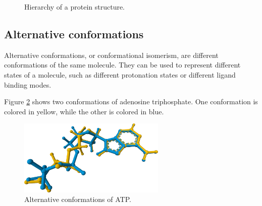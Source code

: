 \documentclass[
  digital,     %
  oneside,     %
  nosansbold,  %
  nocolorbold, %
  lof,         %
  lot,         %
]{fithesis4}
\begin{document}
\begin{figure}[htbp]
  \centering
  \caption{Hierarchy of a protein structure.}
  \label{fig:structure}
\end{figure}

\subsection{Alternative conformations}
\label{section:alternative_conformations}

Alternative conformations, or conformational isomerism, are different conformations of the same molecule. They can be used to represent different states of a molecule, such as different protonation states or different ligand binding modes. 

Figure \ref{fig:alternative_conformations} shows two conformations of adenosine triphosphate. One conformation is colored in yellow, while the other is colored in blue.

\begin{figure}[htbp]
  \begin{center}
    \includegraphics[width=7cm]{figures/alt_conformations.png}
  \end{center}
  \caption{Alternative conformations of ATP.}
  \label{fig:alternative_conformations}
\end{figure}
\end{document}
